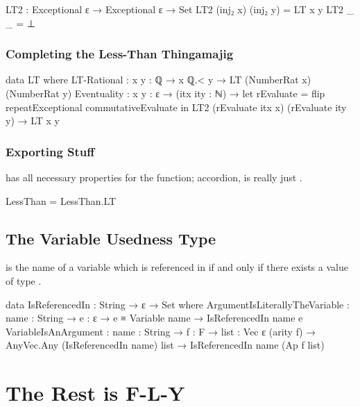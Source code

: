 \documentclass{report}
\begin{document}
\begin{code}
    LT2 : Exceptional ε → Exceptional ε → Set
    LT2 (inj₂ x) (inj₂ y) = LT x y
    LT2 _ _ = ⊥
\end{code}

\section{Completing the Less-Than Thingamajig}

\begin{code}
    data LT where
      LT-Rational :
        {x y : ℚ} → x ℚ.< y → LT (NumberRat x) (NumberRat y)
      Eventuality :
        {x y : ε} →
        (itx ity : ℕ) →
        let rEvaluate = flip repeatExceptional commutativeEvaluate in
        LT2 (rEvaluate itx x) (rEvaluate ity y) →
        LT x y
\end{code}

\section{Exporting Stuff}
 has all necessary properties for the  function; accordion,  is really just .

\begin{code}
  LessThan = LessThan.LT
\end{code}

\chapter{The Variable Usedness Type}
 is the name of a variable which is referenced in  if and only if there exists a value of type   .

\begin{code}
  data IsReferencedIn : String → ε → Set where
    ArgumentIsLiterallyTheVariable :
      {name : String} →
      {e : ε} →
      e ≡ Variable name →
      IsReferencedIn name e
    VariableIsAnArgument :
      {name : String} →
      {f : F} →
      {list : Vec ε (arity f)} →
      AnyVec.Any (IsReferencedIn name) list →
      IsReferencedIn name (Ap f list)
\end{code}

\part{The Rest is F-L-Y}
\end{document}
